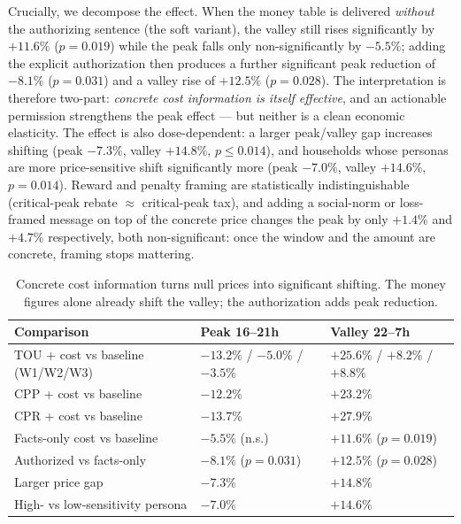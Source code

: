 \documentclass[11pt]{article}
\begin{document}
Crucially, we decompose the effect. When the money table is delivered \emph{without} the authorizing
sentence (the soft variant), the valley still rises significantly by $+11.6\%$ ($p=0.019$) while the peak
falls only non-significantly by $-5.5\%$; adding the explicit authorization then produces a further
significant peak reduction of $-8.1\%$ ($p=0.031$) and a valley rise of $+12.5\%$ ($p=0.028$). The
interpretation is therefore two-part: \emph{concrete cost information is itself effective}, and an
actionable permission strengthens the peak effect --- but neither is a clean economic elasticity. The
effect is also dose-dependent: a larger peak/valley gap increases shifting (peak $-7.3\%$, valley
$+14.8\%$, $p\le0.014$), and households whose personas are more price-sensitive shift significantly more
(peak $-7.0\%$, valley $+14.6\%$, $p=0.014$). Reward and penalty framing are statistically
indistinguishable (critical-peak rebate $\approx$ critical-peak tax), and adding a social-norm or
loss-framed message on top of the concrete price changes the peak by only $+1.4\%$ and $+4.7\%$
respectively, both non-significant: once the window and the amount are concrete, framing stops mattering.

\begin{table}[ht]
\centering\small
\begin{tabular}{lll}
\toprule
Comparison & Peak 16--21h & Valley 22--7h \\
\midrule
TOU + cost vs baseline (W1/W2/W3) & $-13.2\%$ / $-5.0\%$ / $-3.5\%$ & $+25.6\%$ / $+8.2\%$ / $+8.8\%$ \\
CPP + cost vs baseline & $-12.2\%$ & $+23.2\%$ \\
CPR + cost vs baseline & $-13.7\%$ & $+27.9\%$ \\
Facts-only cost vs baseline & $-5.5\%$ (n.s.) & $+11.6\%$ ($p=0.019$) \\
Authorized vs facts-only & $-8.1\%$ ($p=0.031$) & $+12.5\%$ ($p=0.028$) \\
Larger price gap & $-7.3\%$ & $+14.8\%$ \\
High- vs low-sensitivity persona & $-7.0\%$ & $+14.6\%$ \\
\bottomrule
\end{tabular}
\caption{Concrete cost information turns null prices into significant shifting. The money figures alone
already shift the valley; the authorization adds peak reduction.}
\label{tab:priceon}
\end{table}
\end{document}
